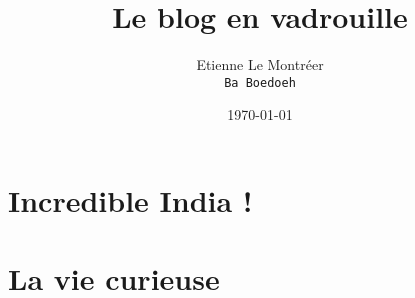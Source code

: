 \documentclass[a4paper, 10pt]{book}
\begin{document}
\frontmatter
\title{Le blog en vadrouille}
\author{Etienne Le Montr\'eer\\
\texttt{Ba Boedoeh}}
\date{\today}

\maketitle

\begin{spacing}{1}
\tableofcontents

\mainmatter

%

\chapter{Incredible India !}

\pagebreak
\pagebreak
\pagebreak
\pagebreak
\pagebreak
\pagebreak
\pagebreak
\pagebreak
\pagebreak
\pagebreak
\pagebreak

\chapter{La vie curieuse}

\pagebreak
\pagebreak
\pagebreak
\pagebreak
\pagebreak
\pagebreak
\pagebreak
\pagebreak
\pagebreak
\pagebreak
\pagebreak
\pagebreak
\pagebreak


\end{spacing}
\end{document}
